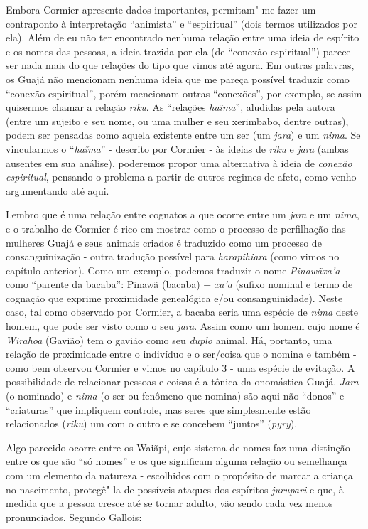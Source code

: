Embora Cormier apresente dados importantes, permitam"-me fazer um
contraponto à interpretação ``animista'' e ``espiritual'' (dois termos
utilizados por ela). Além de eu não ter encontrado nenhuma relação entre
uma ideia de espírito e os nomes das pessoas, a ideia trazida por ela
(de ``conexão espiritual'') parece ser nada mais do que relações do tipo
que vimos até agora. Em outras palavras, os Guajá não mencionam nenhuma
ideia que me pareça possível traduzir como ``conexão espiritual'', porém
mencionam outras ``conexões'', por exemplo, se assim quisermos chamar a
relação \emph{riku}. As ``relações \emph{haĩma}'', aludidas pela autora
(entre um sujeito e seu nome, ou uma mulher e seu xerimbabo, dentre
outras), podem ser pensadas como aquela existente entre um ser (um
\emph{jara}) e um \emph{nima}. Se vincularmos o ``\emph{haĩma}'' -
descrito por Cormier - às ideias de \emph{riku} e \emph{jara} (ambas
ausentes em sua análise), poderemos propor uma alternativa à ideia de
\emph{conexão espiritual}, pensando o problema a partir de outros
regimes de afeto, como venho argumentando até aqui.

Lembro que é uma relação entre cognatos a que ocorre entre um
\emph{jara} e um \emph{nima}, e o trabalho de Cormier é rico em mostrar
como o processo de perfilhação das mulheres Guajá e seus animais criados
é traduzido como um processo de consanguinização - outra tradução
possível para \emph{harapihiara} (como vimos no capítulo anterior). Como
um exemplo, podemos traduzir o nome \emph{Pinawãxa'a} como ``parente da
bacaba'': Pinawã (bacaba) + \emph{xa'a} (sufixo nominal e termo de
cognação que exprime proximidade genealógica e/ou consanguinidade).
Neste caso, tal como observado por Cormier, a bacaba seria uma espécie
de \emph{nima} deste homem, que pode ser visto como o seu \emph{jara}.
Assim como um homem cujo nome é \emph{Wirahoa} (Gavião) tem o gavião
como seu \emph{duplo} animal. Há, portanto, uma relação de proximidade
entre o indivíduo e o ser/coisa que o nomina e também - como bem
observou Cormier e vimos no capítulo 3 - uma espécie de evitação. A
possibilidade de relacionar pessoas e coisas é a tônica da onomástica
Guajá. \emph{Jara} (o nominado) e \emph{nima} (o ser ou fenômeno que
nomina) são aqui não ``donos'' e ``criaturas'' que impliquem controle, mas
seres que simplesmente estão relacionados (\emph{riku}) um com o outro e
se concebem ``juntos'' (\emph{pyry}).

Algo parecido ocorre entre os Waiãpi, cujo sistema de nomes faz uma
distinção entre os que são ``só nomes'' e os que significam alguma relação
ou semelhança com um elemento da natureza - escolhidos com o propósito
de marcar a criança no nascimento, protegê"-la de possíveis ataques dos
espíritos \emph{jurupari} e que, à medida que a pessoa cresce até se
tornar adulto, vão sendo cada vez menos pronunciados. Segundo Gallois:

